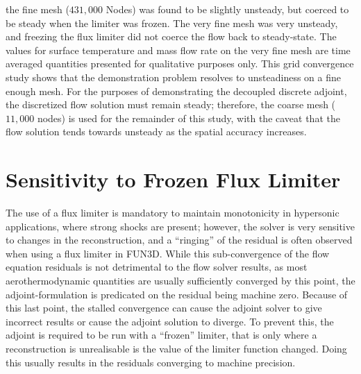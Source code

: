 the fine mesh ($431,000$ Nodes) was found to be slightly unsteady, but coerced
to be steady when the limiter was frozen.  The very fine mesh was very unsteady,
and freezing the flux limiter did not coerce the flow back to steady-state. The
values for surface temperature and mass flow rate on the very fine mesh are time
averaged quantities presented for qualitative purposes only.  This grid
convergence study shows that the demonstration problem resolves to unsteadiness
on a fine enough mesh.  For the purposes of demonstrating the decoupled
discrete adjoint, the discretized flow solution must remain steady; therefore,
the coarse mesh ($11,000$ nodes) is used for the remainder of this study, with
the caveat that the flow solution tends towards unsteady as the spatial accuracy
increases.

\section{Sensitivity to Frozen Flux Limiter}
\label{sec:frozen-limiter}

The use of a flux limiter is mandatory to maintain monotonicity in hypersonic
applications, where strong shocks are present; however, the solver is very
sensitive to changes in the reconstruction, and a ``ringing'' of the residual is
often observed\cite{gnoffo2007ringing} when using a flux limiter in FUN3D. While
this sub-convergence of the flow equation residuals is not detrimental to the
flow solver results, as most aerothermodynamic quantities are usually
sufficiently converged by this point, the adjoint-formulation is predicated on
the residual being machine zero.  Because of this last point, the stalled
convergence can cause the adjoint solver to give incorrect results or cause the
adjoint solution to diverge.  To prevent this, the adjoint is required to be run
with a ``frozen'' limiter, that is only where a reconstruction is unrealisable
is the value of the limiter function changed.  Doing this usually results in the
residuals converging to machine precision.

